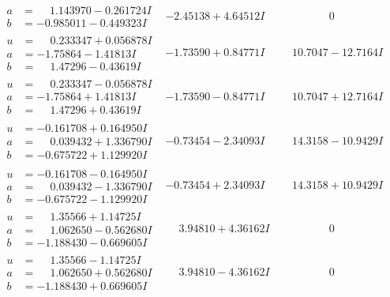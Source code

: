 \documentclass[1p]{elsarticle_modified}
\theoremstyle{definition}
\begin{document}
$$\begin{array}{c|c|c}
\begin{aligned}
a &= \phantom{-}1.143970 - 0.261724 I \\
b &= -0.985011 - 0.449323 I\end{aligned}
 & -2.45138 + 4.64512 I & \phantom{-0.000000 } 0 \\ \hline\begin{aligned}
u &= \phantom{-}0.233347 + 0.056878 I \\
a &= -1.75864 - 1.41813 I \\
b &= \phantom{-}1.47296 - 0.43619 I\end{aligned}
 & -1.73590 + 0.84771 I & \phantom{-}10.7047 - 12.7164 I \\ \hline\begin{aligned}
u &= \phantom{-}0.233347 - 0.056878 I \\
a &= -1.75864 + 1.41813 I \\
b &= \phantom{-}1.47296 + 0.43619 I\end{aligned}
 & -1.73590 - 0.84771 I & \phantom{-}10.7047 + 12.7164 I \\ \hline\begin{aligned}
u &= -0.161708 + 0.164950 I \\
a &= \phantom{-}0.039432 + 1.336790 I \\
b &= -0.675722 + 1.129920 I\end{aligned}
 & -0.73454 - 2.34093 I & \phantom{-}14.3158 - 10.9429 I \\ \hline\begin{aligned}
u &= -0.161708 - 0.164950 I \\
a &= \phantom{-}0.039432 - 1.336790 I \\
b &= -0.675722 - 1.129920 I\end{aligned}
 & -0.73454 + 2.34093 I & \phantom{-}14.3158 + 10.9429 I \\ \hline\begin{aligned}
u &= \phantom{-}1.35566 + 1.14725 I \\
a &= \phantom{-}1.062650 - 0.562680 I \\
b &= -1.188430 - 0.669605 I\end{aligned}
 & \phantom{-}3.94810 + 4.36162 I & \phantom{-0.000000 } 0 \\ \hline\begin{aligned}
u &= \phantom{-}1.35566 - 1.14725 I \\
a &= \phantom{-}1.062650 + 0.562680 I \\
b &= -1.188430 + 0.669605 I\end{aligned}
 & \phantom{-}3.94810 - 4.36162 I & \phantom{-0.000000 } 0 \\ \hline\begin{aligned}

\end{aligned}
\end{array}$$
\end{document}
